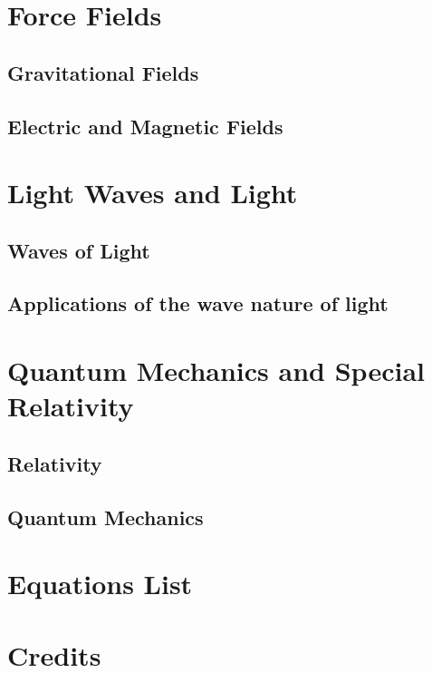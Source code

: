 \documentclass{article}
\begin{document}
\section{Force Fields}
\subsection{Gravitational Fields}
\subsection{Electric and Magnetic Fields}
\section{Light Waves and Light}
\subsection{Waves of Light}
\subsection{Applications of the wave nature of light}
\section{Quantum Mechanics and Special Relativity}
\subsection{Relativity}
\subsection{Quantum Mechanics}




\pagebreak
\appendix
\section*{Equations List}
%


\pagebreak
\printindex

\pagebreak
\section*{Credits}
%
\end{document}
